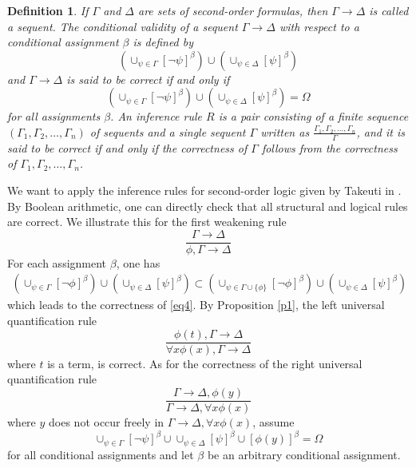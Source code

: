\documentclass{jloganal}
\numberwithin{equation}{section}
\theoremstyle{plain}
\newtheorem{definition}[subsection]{Definition}
\begin{document}
\begin{definition}
If $\Gamma$ and $\Delta$ are sets of second-order formulas, then $\Gamma\rightarrow \Delta$ is called a \emph{sequent}.  
The \emph{conditional validity} of a sequent $\Gamma\rightarrow \Delta$ with respect to a conditional assignment $\beta$ is defined by 
\[
 (\cup_{\psi \in \Gamma} [\neg \psi]^{ \beta}) \cup (\cup_{\psi \in \Delta} [\psi]^{ \beta}) 
\]
and $\Gamma\rightarrow\Delta$ is said to be \emph{correct} if and only if
\[
(\cup_{\psi \in \Gamma} [\neg \psi]^{ \beta}) \cup (\cup_{\psi \in \Delta} [\psi]^{ \beta})=\Omega 
\]
for all assignments $\beta$. 
An inference rule $R$ is a pair consisting of a finite sequence $(\Gamma_{1},\Gamma_{2},\ldots,\Gamma_{n})$ of sequents and a single 
sequent $\Gamma$ written as $\frac{\Gamma_{1},\Gamma_{2},\ldots,\Gamma_{n}}{\Gamma}$, and 
it is said to be correct if and only if the correctness of $\Gamma$ follows from the correctness of $\Gamma_1,\Gamma_{2},\ldots,\Gamma_n$. 
\end{definition}
We want to apply the inference rules for second-order logic given by Takeuti in \cite[p.~9-10 and p.~135-136]{takeuti2013proof}. 
By Boolean arithmetic, one can directly check that all structural and logical rules are correct.     
We illustrate this for the first weakening rule 
\begin{equation}\label{eq4}
\frac{\Gamma\rightarrow\Delta}{\phi,\Gamma\rightarrow\Delta}
\end{equation}
For each assignment $\beta$, one has 
\begin{align*}
(\cup_{\psi \in \Gamma} [\neg \phi]^{ \beta}) \cup (\cup_{\psi \in \Delta} [\psi]^{ \beta}) \subset  (\cup_{\psi \in \Gamma\cup \{\phi\}} [\neg \phi]^{ \beta}) \cup (\cup_{\psi \in \Delta} [\psi]^{ \beta})
\end{align*}
which leads to the correctness of \eqref{eq4}.  
By Proposition \ref{p1}, the left universal quantification rule 
\[
\frac{\phi(t),\Gamma\rightarrow\Delta}{\forall{x}\phi(x),\Gamma\rightarrow\Delta}
\]
where $t$ is a term, is correct.  
As for the correctness of the right universal quantification rule 
\[
\frac{\Gamma\rightarrow\Delta,\phi(y)}{\Gamma\rightarrow\Delta,\forall{x}\phi(x)}
\]
where $y$ does not occur freely in $\Gamma\rightarrow\Delta,\forall{x}\phi(x)$, assume 
\begin{equation}\label{eq2}
\cup_{\psi\in \Gamma} [\neg \psi]^{\beta}\cup \cup_{\psi\in \Delta} [\psi]^{\beta} \cup [\phi(y)]^{\beta}=\Omega 
\end{equation}
for all conditional assignments and let $\beta$ be an arbitrary conditional assignment. 
\end{document}
